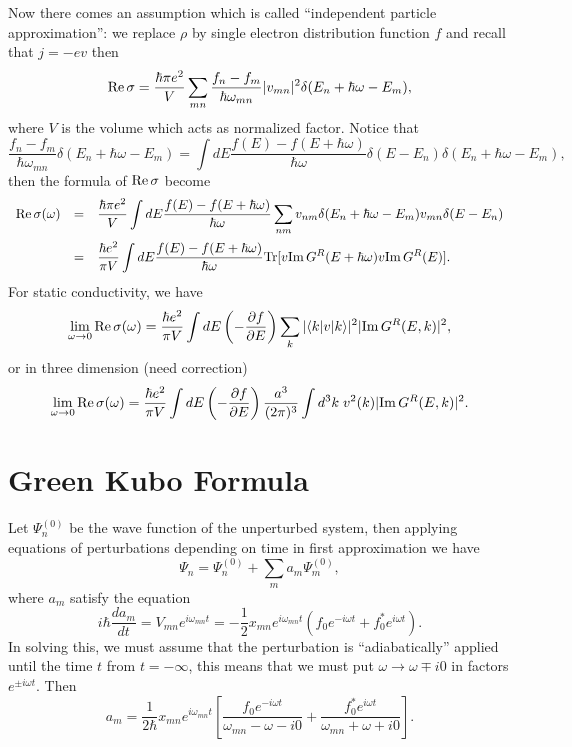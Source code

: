 \documentclass{book}
\newcommand{\bra}[1]{{\langle#1|}}
\newcommand{\ket}[1]{{|#1\rangle}}
\renewcommand{\Re}{{\rm Re}}
\renewcommand{\Im}{{\rm Im}}
\newcommand{\Tr}{{\rm Tr}}
\numberwithin{equation}{section}
\begin{document}
Now there comes an assumption which is called ``independent particle
approximation'': we replace $\rho$ by single electron distribution
function $f$ and recall that $j=-ev$ then
\begin{equation}
  \Re\,\sigma=\frac{\hbar\pi e^2}{V}\sum_{mn}
  \frac{f_n-f_m}{\hbar\omega_{mn}}|v_{mn}|^2\delta(E_n+\hbar\omega-E_m),
\end{equation}
where $V$ is the volume which acts as normalized factor.
Notice that 
\begin{equation}
  \frac{f_n-f_m}{\hbar\omega_{mn}}\delta(E_n+\hbar\omega-E_m)=
  \int dE\frac{f(E)-f(E+\hbar\omega)}{\hbar\omega}
  \delta(E-E_n)\delta(E_n+\hbar\omega-E_m),
\end{equation}
then the formula of $\Re\,\sigma$ become
\begin{equation}
  \begin{array}{rcl}
    \Re\,\sigma(\omega)&=&\displaystyle\frac{\hbar\pi e^2}{V} \int
    dE\frac{f(E)-f(E+\hbar\omega)}{\hbar\omega}\sum_{nm}
    v_{nm}\delta(E_n+\hbar\omega-E_m)v_{mn}\delta(E-E_n)\\\vbox to
    20pt{} &=&\displaystyle\frac{\hbar e^2}{\pi V}\int dE
    \frac{f(E)-f(E+\hbar\omega)}{\hbar\omega}
    \Tr[v\Im\,G^R(E+\hbar\omega)v\Im\,G^R(E)].
  \end{array}
\end{equation}
For static conductivity, we have
\begin{equation}
  \lim_{\omega\to0}\Re\,\sigma(\omega)=
  \frac{\hbar e^2}{\pi V}\int dE
  \left(-\frac{\partial f}{\partial E}\right)
  \sum_k|\bra{k}v\ket{k}|^2|\Im\,G^R(E,k)|^2,
\end{equation}
or in three dimension (need correction)
\begin{equation}
  \lim_{\omega\to0}\Re\,\sigma(\omega)=
  \frac{\hbar e^2}{\pi V}\int dE
  \left(-\frac{\partial f}{\partial E}\right)
  \frac{a^3}{(2\pi)^3}\int d^3k\; v^2(k)|\Im\,G^R(E,k)|^2.
\end{equation}

\section{Green Kubo Formula}
Let $\Psi^{(0)}_n$ be the wave function of the unperturbed system,
then applying equations of perturbations depending on time in first
approximation we have
\begin{equation}
  \Psi_n=\Psi^{(0)}_n+\sum_ma_{m}\Psi^{(0)}_m,
\end{equation}
where $a_m$ satisfy the equation
\begin{equation}
  i\hbar\frac{da_m}{dt}=V_{mn}e^{i\omega_{mn}t}=-\frac{1}{2}
  x_{mn}e^{i\omega_{mn}t}(f_0e^{-i\omega t}+f_0^*e^{i\omega t}).
\end{equation}
In solving this, we must assume that the perturbation is ``adiabatically''
applied until the time $t$ from $t=-\infty$, this means that we must put
$\omega\to\omega\mp i0$ in factors $e^{\pm i\omega t}$. Then
\begin{equation}
  a_m=\frac{1}{2\hbar}x_{mn}e^{i\omega_{mn}t}\left[
    \frac{f_0e^{-i\omega t}}{\omega_{mn}-\omega-i0}+
    \frac{f_0^*e^{i\omega t}}{\omega_{mn}+\omega+i0}\right].
\end{equation}
\end{document}
